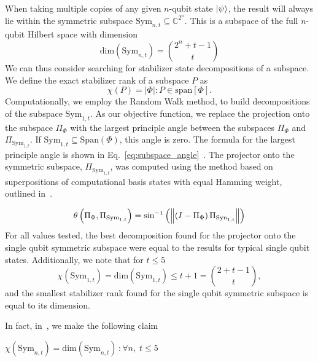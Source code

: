 When taking multiple copies of any given $n$-qubit state $\ket{\psi}$, the result will always lie within the symmetric subspace $\text{Sym}_{n,t}\subseteq \mathbb{C}^{2^{n}}$. This is a subspace of the full $n$-qubit Hilbert space with dimension
\begin{equation}
\text{dim}\left( \text{Sym}_{n,t}\right ) = \binom{2^{n}+t-1}{t}
\end{equation}
We can thus consider searching for stabilizer state decompositions of a subspace. We define the exact stabilizer rank of a subspace $P$ as
\begin{equation}
\chi\left(P\right) = \left| \Phi\right| : P\in \text{span}[\Phi].
\label{eq:subspace_srank}
\end{equation}
Computationally, we employ the Random Walk method, to build decompositions of the subspace $\text{Sym}_{1,t}$. As our objective function, we replace the projection onto the subspace $\Pi_{\Phi}$ with the largest principle angle between the subspaces $\Pi_{\Phi}$ and $\Pi_{\text{Sym}_{1,t}}$. If $\text{Sym}_{1,t}\subseteq\text{Span}\left(\Phi\right)$, this angle is zero. The formula for the largest principle angle is shown in Eq.~\ref{eq:subspace_angle}~\cite{Knyazev2002}. The projector onto the symmetric subspace, $\Pi_{\text{Sym}_{1,t}}$, was computed using the method based on superpositions of computational basis states with equal Hamming weight, outlined in~\cite{Harrow2013}.\par
\begin{equation}
\theta\left(\Pi_{\Phi},\Pi_{\text{Sym}_{1,t}}\right)=\sin^{-1}\left(\norm{\left(I-\Pi_{\Phi}\right)\Pi_{\text{Syn}_{1,t}}}\right)
\label{eq:subspace_angle}
\end{equation}
For all values tested, the best decomposition found for the projector onto the single qubit symmetric subspace were equal to the results for typical single qubit states. Additionally, we note that for $t\leq 5$
\begin{equation}
\chi\left(\text{Sym}_{1,t}\right) = \text{dim}\left( \text{Sym}_{1,t}\right) \leq t+1 = \binom{2+t-1}{t},
\end{equation}
and the smallest stabilizer rank found for the single qubit symmetric subspace is equal to its dimension.\par
In fact, in~\cite{Bravyi2018}, we make the following claim
\begin{cla}
$\chi\left(\text{Sym}_{n,t}\right)=\text{dim}\left(\text{Sym}_{n,t}\right)\,:\forall n,\; t\leq 5$\label{cla:symmetric_srank}
\end{cla}
